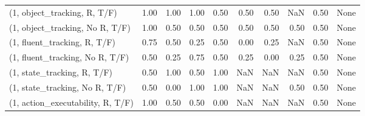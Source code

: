 \begin{table*}[h!]
\begin{adjustbox}{width=2\columnwidth,center}
\begin{tabular}{lrrr|rrr|rrr}
\midrule
(1, object\_tracking, R, T/F)         &                      1.00 &                  1.00 &                      1.00 &                          0.50 &                      0.50 &                          0.50 &                                    NaN &                               0.50 &                                  None \\
(1, object\_tracking, No R, T/F)      &                      1.00 &                  0.50 &                      0.50 &                          0.50 &                      0.50 &                          0.50 &                                   0.50 &                               0.50 &                                  None \\
(1, fluent\_tracking, R, T/F)         &                      0.75 &                  0.50 &                      0.25 &                          0.50 &                      0.00 &                          0.25 &                                    NaN &                               0.50 &                                  None \\
(1, fluent\_tracking, No R, T/F)      &                      0.50 &                  0.25 &                      0.75 &                          0.50 &                      0.25 &                          0.00 &                                   0.25 &                               0.50 &                                  None \\
(1, state\_tracking, R, T/F)          &                      0.50 &                  1.00 &                      0.50 &                          1.00 &                       NaN &                           NaN &                                    NaN &                               0.50 &                                  None \\
(1, state\_tracking, No R, T/F)       &                      0.50 &                  0.00 &                      1.00 &                          1.00 &                       NaN &                           NaN &                                   0.50 &                               0.50 &                                  None \\
(1, action\_executability, R, T/F)    &                      1.00 &                  0.50 &                      0.50 &                          0.00 &                       NaN &                           NaN &                                    NaN &                               0.50 &                                  None \\

\end{tabular}
\end{adjustbox}
\end{table*}
